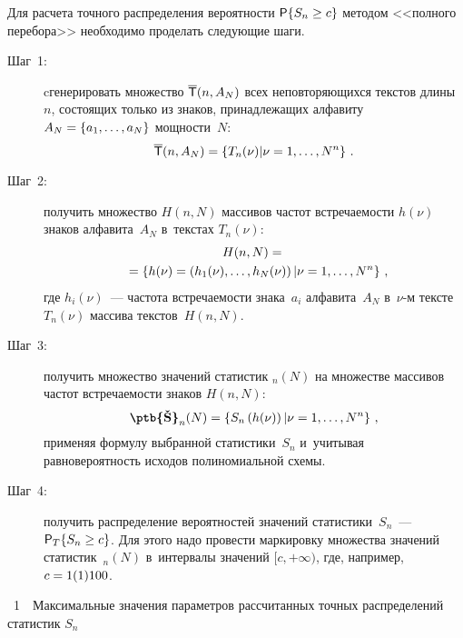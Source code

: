 \begin{multicols}{2}
    Для расчета точного распределения вероятности ${\sf P}\{S_n\hm\geq c\}$ 
методом <<полного перебора>> необходимо проделать следующие шаги.
    \begin{description}
    \item[Шаг~1:] cгенерировать множество $\overline{\sf T}(n, A_N)$ всех 
неповторяющихся текстов длины~$n$, состоящих только из знаков, 
принадлежащих алфавиту $A_N\hm = \{a_1,\ldots, a_N\}$ мощности~$N$:
$$
\overline{\sf T}(n,A_N) = \left\{T_n(\nu)\vert  \nu= 1, \ldots, N^n\right\}\,.
$$
    \item[Шаг~2:] получить множество $H(n,N)$ массивов 
час\-тот встречаемости $h(\nu)$ знаков алфавита~$A_N$ в~текстах $T_n (\nu)$:
    \begin{multline*}
    H(n, N) ={}\\
    {}= \left\{h(\nu)= \left(h_1(\nu), \ldots, h_N 
(\nu)\right)\vert  \nu= 1, \ldots, N^n\right\}\,,\hspace*{-4.2pt}
    \end{multline*}
где $h_i(\nu)$~--- частота встречаемости знака~$a_i$ алфавита~$A_N$ 
в~$\nu$-м тексте $T_n(\nu)$ массива текстов~$H(n, N)$.
    \item[Шаг~3:] получить множество значений статистик 
{\textbf{}}$_n(N)$ на множестве массивов частот встре\-ча\-емости знаков 
$H(n, N)$:
    $$
    \mbox{{\textbf{\ptb{\v{S}}}}}_n(N)= \left\{S_n\left(h(\nu)\right) \vert \nu= 1, \ldots, N^n\right\}\,,
    $$
применяя формулу выбранной статистики~$S_n$ и~учитывая 
равновероятность исходов полиномиальной схемы. 
    \item[Шаг~4:] получить распределение вероятностей значений 
статистики~$S_n$~--- ${\sf P}_T\{S_n \hm\geq c\}$. Для этого надо провести 
маркировку множества значений статистик~{\!\textbf{}}$_n(N)$ в~интервалы 
значений $[c, +\infty)$, где, например, $c\hm = 1(1)100$.
    \end{description}
    

{\small
 \begin{center} 
\parbox{64mm}{{{\tablename~1}\ \ \small{Максимальные значения па\-ра\-мет\-ров рассчитанных точных распределений 
статистик $S_n$}}
}

\vspace*{6pt}


\end{center}}
\end{multicols}
